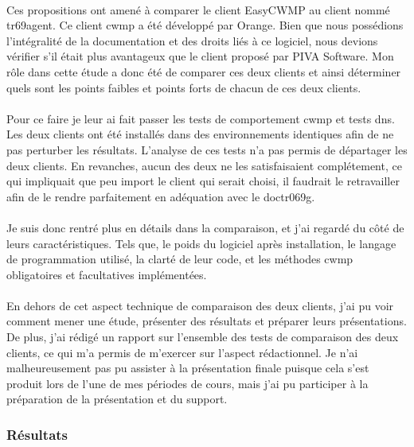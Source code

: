 \documentclass[12pt,a4paper]{report}
\begin{document}
\paragraph*{}Ces propositions ont amené à comparer le client EasyCWMP au client nommé tr69agent. Ce client \gls{cwmp} a été développé par Orange. Bien que nous possédions l’intégralité de la documentation et des droits liés à ce logiciel, nous devions vérifier s’il était plus avantageux que le client proposé par PIVA Software. Mon rôle dans cette étude a donc été de comparer ces deux clients et ainsi déterminer quels sont les points faibles et points forts de chacun de ces deux clients.
\paragraph*{}Pour ce faire je leur ai fait passer les tests de comportement \gls{cwmp} et tests \gls{dns}. Les deux clients ont été installés dans des environnements identiques afin de ne pas perturber les résultats. L’analyse de ces tests n’a pas permis de départager les deux clients. En revanches, aucun des deux ne les satisfaisaient complétement, ce qui impliquait que peu import le client qui serait choisi, il faudrait le retravailler afin de le rendre parfaitement en adéquation avec le \gls{doctr069g}.
\paragraph*{} Je suis donc rentré plus en détails dans la comparaison, et j’ai regardé du côté de leurs caractéristiques. Tels que, le poids du logiciel après installation, le langage de programmation utilisé, la clarté de leur code, et les méthodes \gls{cwmp} obligatoires et facultatives implémentées.
\paragraph*{}En dehors de cet aspect technique de comparaison des deux clients, j’ai pu voir comment mener une étude, présenter des résultats et préparer leurs présentations. De plus, j’ai rédigé un rapport sur l’ensemble des tests de comparaison des deux clients, ce qui m’a permis de m’exercer sur l’aspect rédactionnel. Je n’ai malheureusement pas pu assister à la présentation finale puisque cela s’est produit lors de l’une de mes périodes de cours, mais j'ai pu participer à la préparation de la présentation et du support. \\
\subsubsection{Résultats} %
\end{document}
